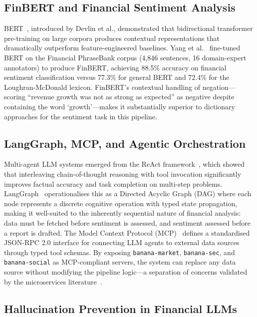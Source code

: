 \documentclass[10pt,journal,compsoc]{IEEEtran}
\newcommand{\node}[1]{\texttt{#1}}
\begin{document}
\subsection{FinBERT and Financial Sentiment Analysis}

BERT~\cite{devlin2019bert}, introduced by Devlin et al., demonstrated
that bidirectional transformer pre-training on large corpora produces
contextual representations that dramatically outperform
feature-engineered baselines.
Yang et al.~\cite{yang2020finbert} fine-tuned BERT on the Financial
PhraseBank corpus (4,846 sentences, 16 domain-expert annotators) to
produce FinBERT, achieving 88.5\% accuracy on financial sentiment
classification versus 77.3\% for general BERT and 72.4\% for the
Loughran-McDonald lexicon.
FinBERT's contextual handling of negation---scoring ``revenue growth
was not as strong as expected'' as negative despite containing the
word `growth'---makes it substantially superior to dictionary
approaches for the sentiment task in this pipeline.

\subsection{LangGraph, MCP, and Agentic Orchestration}

Multi-agent LLM systems emerged from the ReAct
framework~\cite{yao2023react}, which showed that interleaving
chain-of-thought reasoning with tool invocation significantly improves
factual accuracy and task completion on multi-step problems.
LangGraph~\cite{langgraph2023} operationalises this as a Directed
Acyclic Graph (DAG) where each node represents a discrete cognitive
operation with typed state propagation, making it well-suited to the
inherently sequential nature of financial analysis: data must be
fetched before sentiment is assessed, and sentiment assessed before
a report is drafted.
The Model Context Protocol (MCP)~\cite{mcp2024} defines a
standardised JSON-RPC 2.0 interface for connecting LLM agents to
external data sources through typed tool schemas.
By exposing \node{banana-market}, \node{banana-sec}, and
\node{banana-social} as MCP-compliant servers, the system can replace
any data source without modifying the pipeline logic---a separation of
concerns validated by the microservices literature~\cite{newman2015}.

\subsection{Hallucination Prevention in Financial LLMs}
\end{document}
